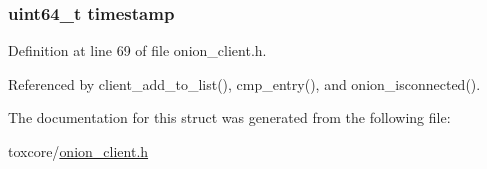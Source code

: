 \hypertarget{struct_onion___node_a465bef81f6478756e5443025b1f2ddfa}{
\subsubsection[{timestamp}]{\setlength{\rightskip}{0pt plus 5cm}uint64\+\_\+t timestamp}}\label{struct_onion___node_a465bef81f6478756e5443025b1f2ddfa}


Definition at line 69 of file onion\+\_\+client.\+h.



Referenced by client\+\_\+add\+\_\+to\+\_\+list(), cmp\+\_\+entry(), and onion\+\_\+isconnected().



The documentation for this struct was generated from the following file\+:\begin{DoxyCompactItemize}
\item 
toxcore/\hyperlink{onion__client_8h}{onion\+\_\+client.\+h}\end{DoxyCompactItemize}

